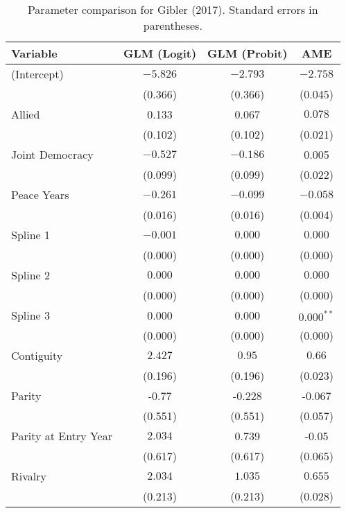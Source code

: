 \begin{table}[ht]
\centering
\begingroup\normalsize
\begin{tabular}{lccc}
 Variable & GLM (Logit) & GLM (Probit) & AME \\ 
  \hline
\hline
(Intercept) & $-5.826$ & $-2.793$ & $-2.758$ \\ 
   & (0.366) & (0.366) & (0.045) \\ 
  Allied & 0.133 & 0.067 & $0.078$ \\ 
   & (0.102) & (0.102) & (0.021) \\ 
  Joint Democracy & $-0.527$ & $-0.186$ & 0.005 \\ 
   & (0.099) & (0.099) & (0.022) \\ 
  Peace Years & $-0.261$ & $-0.099$ & $-0.058$ \\ 
   & (0.016) & (0.016) & (0.004) \\ 
  Spline 1 & $-0.001$ & $0.000$ & $0.000$ \\ 
   & (0.000) & (0.000) & (0.000) \\ 
  Spline 2 & $0.000$ & $0.000$ & $0.000$ \\ 
   & (0.000) & (0.000) & (0.000) \\ 
  Spline 3 & 0.000 & 0.000 & $0.000^{\ast\ast}$ \\ 
   & (0.000) & (0.000) & (0.000) \\ 
  Contiguity & $2.427$ & $0.95$ & $0.66$ \\ 
   & (0.196) & (0.196) & (0.023) \\ 
  Parity & -0.77 & -0.228 & -0.067 \\ 
   & (0.551) & (0.551) & (0.057) \\ 
  Parity at Entry Year & $2.034$ & 0.739 & -0.05 \\ 
   & (0.617) & (0.617) & (0.065) \\ 
  Rivalry & $2.034$ & $1.035$ & $0.655$ \\ 
   & (0.213) & (0.213) & (0.028) \\ 
   \hline
\hline
\end{tabular}
\endgroup
\caption{Parameter comparison for Gibler (2017). Standard errors in parentheses. } 
\label{tab:gibler_coef}
\end{table}
